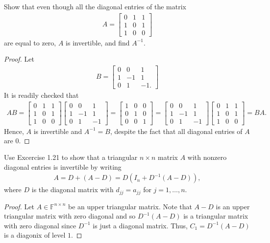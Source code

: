 \documentclass[12pt]{article}
\newenvironment{problem}[2][Problem]{\begin{trivlist} \item[\hskip \labelsep {\bfseries #1}\hskip \labelsep {\bfseries #2.}]}{\end{trivlist}}
\begin{document}
\begin{problem}{1.22}
  Show that even though all the diagonal entries of the matrix
\begin{align*}
A=
\begin{bmatrix}
  0 & 1 & 1\\ 1 & 0 & 1\\ 1 & 0 & 0
\end{bmatrix}
\end{align*}
are equal to zero, $A$ is invertible, and find $A^{-1}$. 
\begin{proof}
  Let 
\begin{align*}
  B=
\begin{bmatrix}
  0 & 0 & 1\\ 1 & -1 & 1\\ 0 & 1 & -1. 
\end{bmatrix}
\end{align*}
It is readily checked that 
\begin{align*}
  AB = 
\begin{bmatrix}
  0 & 1 & 1\\ 1 & 0 & 1\\ 1 & 0 & 0 
\end{bmatrix}
\begin{bmatrix}
  0 & 0 & 1\\ 1 & -1 & 1\\ 0 & 1 & -1 
\end{bmatrix}
= 
\begin{bmatrix}
  1 & 0 & 0\\ 0 & 1 & 0\\ 0 & 0 & 1 
\end{bmatrix}
=
\begin{bmatrix}
  0 & 0 & 1\\ 1 & -1 & 1\\ 0 & 1 & -1 
\end{bmatrix}
\begin{bmatrix}
  0 & 1 & 1\\ 1 & 0 & 1\\ 1 & 0 & 0 
\end{bmatrix}
= BA.
\end{align*}
Hence, $A$ is invertible and $A^{-1}=B$, despite the fact that all diagonal entries of $A$ are $0$. 
\end{proof}
\end{problem}
\begin{problem}{1.23}
  Use Excercise 1.21 to show that a triangular $n\times n$ matrix $A$ with nonzero diagonal entries is invertible by writing
\begin{align*}
  A= D+(A-D) = D(I_{n}+D^{-1}(A-D)),
\end{align*}
where $D$ is the diagonal matrix with $d_{jj} = a_{jj}$ for $j=1,\dots,n$. 
\begin{proof}
  Let $A\in \mathbb{F}^{n\times n}$ be an upper triangular matrix. Note that $A-D$ is an upper triangular matrix with zero diagonal and so $D^{-1}(A-D)$ is a triangular matrix with zero diagonal since $D^{-1}$ is just a diagonal matrix. Thus, $C_{1} = D^{-1}(A-D)$ is a diagonix of level $1$. 
\end{proof}
\end{problem}
\end{document}
